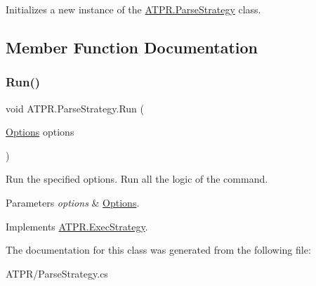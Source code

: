 Initializes a new instance of the \hyperlink{class_a_t_p_r_1_1_parse_strategy}{A\+T\+P\+R.\+Parse\+Strategy} class. 



\subsection{Member Function Documentation}
\hypertarget{class_a_t_p_r_1_1_parse_strategy_ae5b4ddf4a1578070dfaa1c332a118438}{}\label{class_a_t_p_r_1_1_parse_strategy_ae5b4ddf4a1578070dfaa1c332a118438} 
\subsubsection{\texorpdfstring{Run()}{Run()}}
{\footnotesize\ttfamily void A\+T\+P\+R.\+Parse\+Strategy.\+Run (\begin{DoxyParamCaption}\item[{\hyperlink{class_a_t_p_r_1_1_options}{Options}}]{options }\end{DoxyParamCaption})\hspace{0.3cm}{\ttfamily [inline]}}



Run the specified options. Run all the logic of the command. 


\begin{DoxyParams}{Parameters}
{\em options} & \hyperlink{class_a_t_p_r_1_1_options}{Options}.\\
\hline
\end{DoxyParams}


Implements \hyperlink{interface_a_t_p_r_1_1_exec_strategy}{A\+T\+P\+R.\+Exec\+Strategy}.



The documentation for this class was generated from the following file\+:\begin{DoxyCompactItemize}
\item 
A\+T\+P\+R/Parse\+Strategy.\+cs\end{DoxyCompactItemize}
